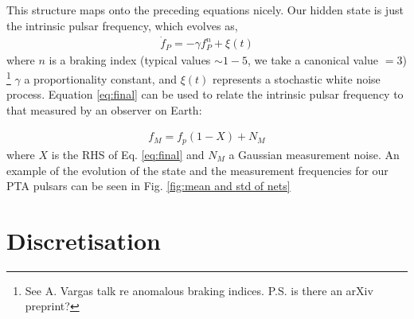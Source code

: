 \documentclass[fleqn,usenatbib,useAMS]{mnras}
\begin{document}
\noindent This structure maps onto the preceding equations nicely. Our hidden state is just the intrinsic pulsar frequency, which evolves as,
\begin{eqnarray}
	\dot{f}_P = -\gamma f_P^n + \xi(t)
\end{eqnarray}
where $n$ is a braking index (typical values $\sim 1-5$, we take a canonical value $=3$) \footnote{See A. Vargas talk re anomalous braking indices. P.S. is there an arXiv preprint?} $\gamma$ a proportionality constant, and $\xi(t)$ represents a stochastic white noise process. Equation \ref{eq:final} can be used to relate the intrinsic pulsar frequency to that measured by an observer on Earth:

\begin{eqnarray}
	f_M = f_p(1 - X) + N_M
\end{eqnarray}
where $X$ is the RHS of Eq. \ref{eq:final} and $N_M$ a Gaussian measurement noise. An example of the evolution of the state and the measurement frequencies for our PTA pulsars can be seen in Fig. \ref{fig:mean and std of nets}









\section{Discretisation}
\end{document}
